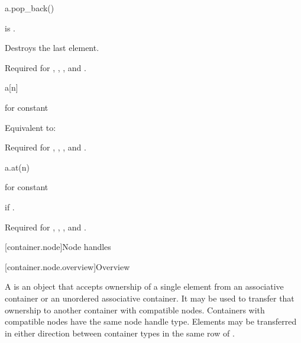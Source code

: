 \begin{itemdecl}
a.pop_back()
\end{itemdecl}

\begin{itemdescr}
\pnum
\result
{}

\pnum
\expects
{} is .

\pnum
\effects
Destroys the last element.

\pnum
\remarks
Required for
,
,
, and
.
\end{itemdescr}

\begin{itemdecl}
a[n]
\end{itemdecl}

\begin{itemdescr}
\pnum
\result
{} for constant 

\pnum
\effects
Equivalent to: 

\pnum
\remarks
Required for
,
,
, and
.
\end{itemdescr}

\begin{itemdecl}
a.at(n)
\end{itemdecl}

\begin{itemdescr}
\pnum
\result
{} for constant 

\pnum
\returns
{}

\pnum
\throws
{} if .

\pnum
\remarks
Required for
,
,
, and
.
\end{itemdescr}

[container.node]{Node handles}

[container.node.overview]{Overview}

\pnum
A  is an object that accepts ownership of a single element
from an associative container or an unordered
associative container. It may be used to transfer that
ownership to another container with compatible nodes.  Containers with
compatible nodes have the same node handle type. Elements may be transferred in
either direction between container types in the same row of
.

